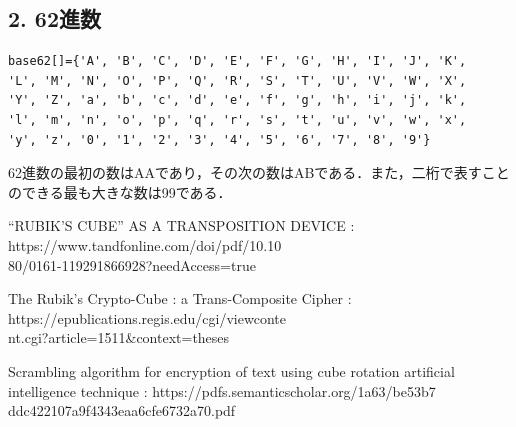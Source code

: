 \documentclass[titlepage]{jarticle}
\begin{document}
\subsection{2. 62進数}
\begin{verbatim}
base62[]={'A', 'B', 'C', 'D', 'E', 'F', 'G', 'H', 'I', 'J', 'K', 
'L', 'M', 'N', 'O', 'P', 'Q', 'R', 'S', 'T', 'U', 'V', 'W', 'X', 
'Y', 'Z', 'a', 'b', 'c', 'd', 'e', 'f', 'g', 'h', 'i', 'j', 'k', 
'l', 'm', 'n', 'o', 'p', 'q', 'r', 's', 't', 'u', 'v', 'w', 'x', 
'y', 'z', '0', '1', '2', '3', '4', '5', '6', '7', '8', '9'}
\end{verbatim}
62進数の最初の数はAAであり，その次の数はABである．また，二桁で表すことのできる最も大きな数は99である．

\begin{flushleft}
\begin{thebibliography}{}

 “RUBIK'S CUBE” AS A TRANSPOSITION DEVICE : https://www.tandfonline.com/doi/pdf/10.10\\80/0161-119291866928?needAccess=true

The Rubik's Crypto-Cube : a Trans-Composite Cipher : https://epublications.regis.edu/cgi/viewconte\\nt.cgi?article=1511\&context=theses

Scrambling algorithm for encryption of text using cube rotation artificial intelligence technique : https://pdfs.semanticscholar.org/1a63/be53b7\\ddc422107a9f4343eaa6cfe6732a70.pdf

\end{thebibliography}
\end{flushleft}
\end{document}

